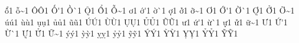 {	{ổ}{{\h \ocircumflex }}1
	{ỗ}{{\~\ocircumflex }}1
	{Ô}{{\^O}}1
	{Ố}{{\'\OCIRCUMFLEX }}1
	{Ồ}{{\`\OCIRCUMFLEX }}1
	{Ộ}{{\d \OCIRCUMFLEX }}1
	{Ổ}{{\h \OCIRCUMFLEX }}1
	{Ỗ}{{\~\OCIRCUMFLEX }}1
%
	{ơ}{{\ohorn }}1
	{ớ}{{\'\ohorn }}1
	{ờ}{{\`\ohorn }}1
	{ợ}{{\d \ohorn }}1
	{ở}{{\h \ohorn }}1
	{ỡ}{{\~\ohorn }}1
	{Ơ}{{\OHORN }}1
	{Ớ}{{\'\OHORN }}1
	{Ờ}{{\`\OHORN }}1
	{Ợ}{{\d \OHORN }}1
	{Ở}{{\h \OHORN }}1
	{Ỡ}{{\~\OHORN }}1
%
	{ú}{{\'u}}1
	{ù}{{\`u}}1
	{ụ}{{\d u}}1
	{ủ}{{\h u}}1
	{ũ}{{\~u}}1
	{Ú}{{\'U}}1
	{Ù}{{\`U}}1
	{Ụ}{{\d U}}1
	{Ủ}{{\h U}}1
	{Ũ}{{\~U}}1
%
	{ư}{{\uhorn }}1
	{ứ}{{\'\uhorn }}1
	{ừ}{{\`\uhorn }}1
	{ự}{{\d \uhorn }}1
	{ử}{{\h \uhorn }}1
	{ữ}{{\~\uhorn }}1
	{Ư}{{\UHORN }}1
	{Ứ}{{\'\UHORN }}1
	{Ừ}{{\`\UHORN }}1
	{Ự}{{\d \UHORN }}1
	{Ử}{{\h \UHORN }}1
	{Ữ}{{\~\UHORN }}1
%
	{ý}{{\'y}}1
	{ỳ}{{\`y}}1
	{ỵ}{{\d y}}1
	{ỷ}{{\h y}}1
	{ỹ}{{\~y}}1
	{Ý}{{\'Y}}1
	{Ỳ}{{\`Y}}1
	{Ỵ}{{\d Y}}1
	{Ỷ}{{\h Y}}1
	{Ỹ}{{\~Y}}1
}

\lstset{style=mystyle} 
